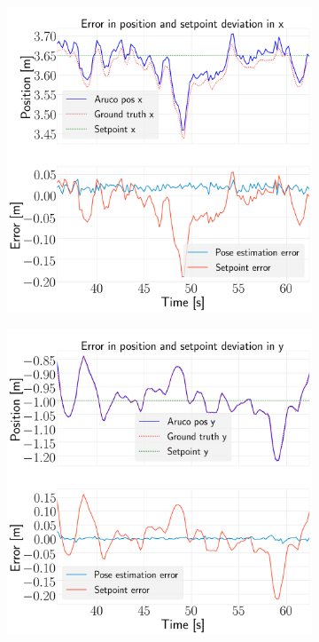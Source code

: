 \documentclass[../Head/report.tex]{subfiles}
\begin{document}
\begin{figure}[H]
    \centering
    \begin{subfigure}[t]{.30\textwidth}
        \centering
        \includegraphics[width=\textwidth]{../Figures/hold_pose_using_aruco_pose_estimation/test2_gps2visionBoard_1.0Wind_-1.0y/error_x/pose_error_x_test1.png}
        \caption{}
        \label{fig:hold_pose_estimation_test2_x}
    \end{subfigure}
     \hspace{0.2em}
    \begin{subfigure}[t]{.30\textwidth}
        \centering
        \includegraphics[width=\textwidth]{../Figures//hold_pose_using_aruco_pose_estimation/test2_gps2visionBoard_1.0Wind_-1.0y/error_y/pose_error_y_test1.png}

\end{subfigure}
\end{figure}
\end{document}

